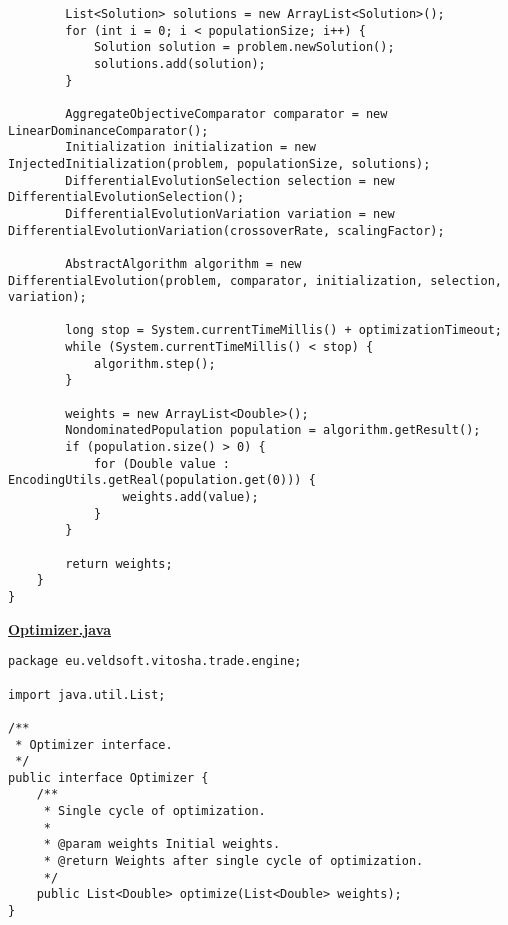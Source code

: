 \begin{verbatim}
        List<Solution> solutions = new ArrayList<Solution>();
        for (int i = 0; i < populationSize; i++) {
            Solution solution = problem.newSolution();
            solutions.add(solution);
        }

        AggregateObjectiveComparator comparator = new LinearDominanceComparator();
        Initialization initialization = new InjectedInitialization(problem, populationSize, solutions);
        DifferentialEvolutionSelection selection = new DifferentialEvolutionSelection();
        DifferentialEvolutionVariation variation = new DifferentialEvolutionVariation(crossoverRate, scalingFactor);

        AbstractAlgorithm algorithm = new DifferentialEvolution(problem, comparator, initialization, selection, variation);

        long stop = System.currentTimeMillis() + optimizationTimeout;
        while (System.currentTimeMillis() < stop) {
            algorithm.step();
        }

        weights = new ArrayList<Double>();
        NondominatedPopulation population = algorithm.getResult();
        if (population.size() > 0) {
            for (Double value : EncodingUtils.getReal(population.get(0))) {
                weights.add(value);
            }
        }

        return weights;
    }
}
\end{verbatim}

\textbf{\underline{Optimizer.java}}
\begin{verbatim}
package eu.veldsoft.vitosha.trade.engine;

import java.util.List;

/**
 * Optimizer interface.
 */
public interface Optimizer {
    /**
     * Single cycle of optimization.
     *
     * @param weights Initial weights.
     * @return Weights after single cycle of optimization.
     */
    public List<Double> optimize(List<Double> weights);
}
\end{verbatim}

